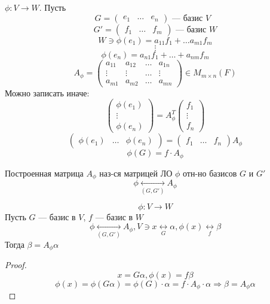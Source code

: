 \begin{definition}[Матрицы ЛО]
  $\phi \colon V \rightarrow W$. Пусть
  \[
    G = \begin{pmatrix}e_1 & \ldots & e_n \end{pmatrix} \text{ --- базис $V$ }
  \]
  \[
    G' = \begin{pmatrix}f_1 & \ldots & f_m \end{pmatrix} \text{ --- базис $W$}
  \]
  \[
  W \ni \phi(e_1) = a_{11} f_1 + \ldots a_{m 1} f_m
  \]
  \[
    \vdots
  \]
  \[
   \phi(e_n) = a_{n 1} f_1 + \ldots + a_{n m} f_m
  \]
  \[
    A_{\phi} = \begin{pmatrix}a_{11} & a_{12} & \ldots & a_{1n} \\ \vdots & \vdots & \ldots & \vdots \\ a_{m 1} & a_{m 2} & \ldots & a_{mn}\end{pmatrix} \in M_{m \times n}(F)
  \]
  Можно записать иначе:
  \[
  \begin{pmatrix}\phi(e_1) \\ \vdots \\ \phi(e_n) \end{pmatrix} = A_{\phi}^{T} \begin{pmatrix}f_1 \\ \vdots \\ f_n \end{pmatrix}
  \]
  \[
    \begin{pmatrix}\phi(e_1) & \ldots & \phi(e_n) \end{pmatrix} = \begin{pmatrix}f_1 & \ldots & f_n \end{pmatrix} A_{\phi}
  \]
  \[
  \phi(G) = f \cdot A_{\phi}
  \]
\end{definition}
\begin{definition}
Построенная матрица $A_\phi$ наз-ся матрицей ЛО $\phi$ отн-но базисов $G$ и $G'$
\[
\phi \underset{(G, G')}{\longleftrightarrow} A_\phi
\]
\end{definition}
\begin{statement}
\[
\phi \colon V \rightarrow W
\]
Пусть $G$ --- базис в $V$, $f$ --- базис в $W$
\[
\phi \underset{(G, G')}{\longleftrightarrow} A_\phi, V \ni x\underset{G}{\longleftrightarrow} \alpha, \phi(x) \underset{f}{\longleftrightarrow} \beta
\]
Тогда $\beta = A_\phi \alpha$
\end{statement}
\begin{proof}
\[
x = G \alpha, \phi(x) = f \beta
\]
\[
\phi(x) = \phi(G \alpha) = \phi(G) \cdot \alpha = f \cdot A_\phi \cdot \alpha \Rightarrow \beta = A_\phi \alpha
\]
\end{proof}
